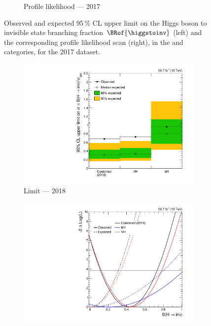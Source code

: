 \begin{figure}[htbp]
\begin{subfigure}[t]{0.45\textwidth}
        \caption{Profile likelihood --- 2017}
    \end{subfigure}
    \caption[Observed and expected 95\,\% CL upper limit on the Higgs boson to invisible state branching fraction $\BRof{\higgstoinv}$ and the corresponding profile likelihood scan, in the \ttH and \VH categories, for the 2017 dataset]{Observed and expected 95\,\% CL upper limit on the Higgs boson to invisible state branching fraction $\BRof{\higgstoinv}$ (left) and the corresponding profile likelihood scan (right), in the \ttH and \VH categories, for the 2017 dataset.}
    \label{fig:htoinv_limit_likelihood_2017}
\end{figure}

\begin{figure}[htbp]
    \centering
    \begin{subfigure}[t]{0.45\textwidth}
        \includegraphics[width=\textwidth]{chapters/higgstoinv/figures/limits/per_year/limit_2018_comb.pdf}
        \caption{Limit --- 2018}
    \end{subfigure}
    \hspace{0.05\textwidth}
    \begin{subfigure}[t]{0.45\textwidth}
        \includegraphics[width=\textwidth]{chapters/higgstoinv/figures/likelihood_scan/profile_likelihood_scan_2018.pdf}

\end{subfigure}
\end{figure}
